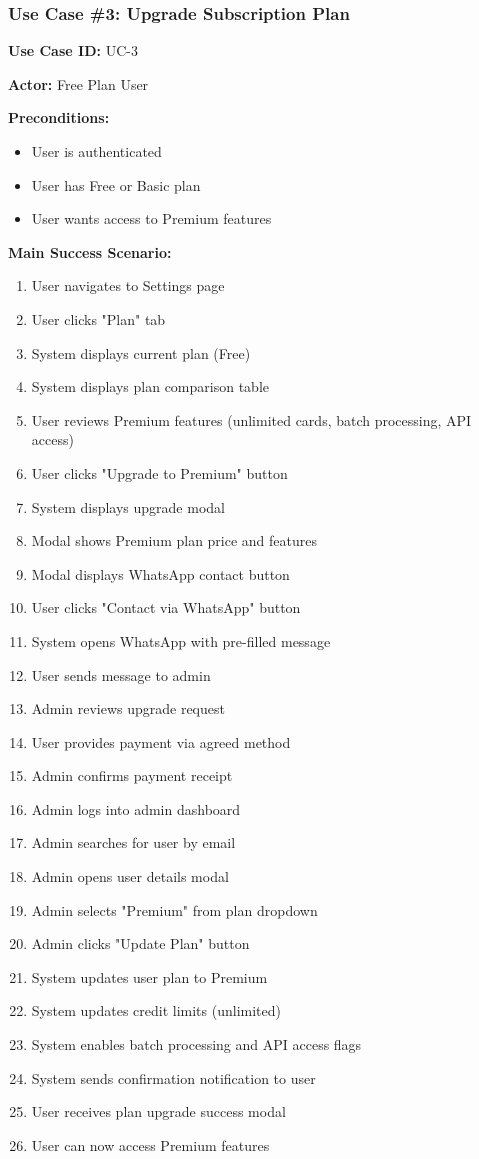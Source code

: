 \documentclass[12pt,a4paper]{article}
\begin{document}
\subsubsection{Use Case \#3: Upgrade Subscription Plan}

\textbf{Use Case ID:} UC-3

\textbf{Actor:} Free Plan User

\textbf{Preconditions:}
\begin{itemize}
    \item User is authenticated
    \item User has Free or Basic plan
    \item User wants access to Premium features
\end{itemize}

\textbf{Main Success Scenario:}
\begin{enumerate}
    \item User navigates to Settings page
    \item User clicks "Plan" tab
    \item System displays current plan (Free)
    \item System displays plan comparison table
    \item User reviews Premium features (unlimited cards, batch processing, API access)
    \item User clicks "Upgrade to Premium" button
    \item System displays upgrade modal
    \item Modal shows Premium plan price and features
    \item Modal displays WhatsApp contact button
    \item User clicks "Contact via WhatsApp" button
    \item System opens WhatsApp with pre-filled message
    \item User sends message to admin
    \item Admin reviews upgrade request
    \item User provides payment via agreed method
    \item Admin confirms payment receipt
    \item Admin logs into admin dashboard
    \item Admin searches for user by email
    \item Admin opens user details modal
    \item Admin selects "Premium" from plan dropdown
    \item Admin clicks "Update Plan" button
    \item System updates user plan to Premium
    \item System updates credit limits (unlimited)
    \item System enables batch processing and API access flags
    \item System sends confirmation notification to user
    \item User receives plan upgrade success modal
    \item User can now access Premium features
\end{enumerate}
\end{document}
